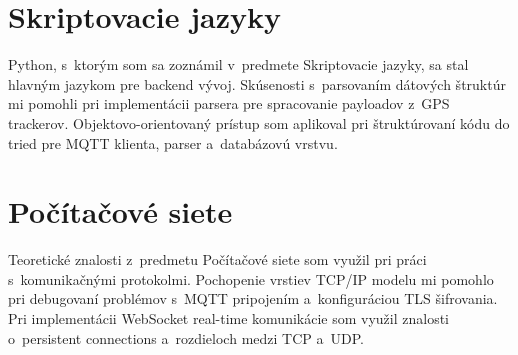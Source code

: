 \section{Skriptovacie jazyky}
\label{sec:ZnalostPython}

Python, s~ktorým som sa zoznámil v~predmete Skriptovacie jazyky, sa stal hlavným jazykom pre backend vývoj. Skúsenosti s~parsovaním dátových štruktúr mi pomohli pri implementácii parsera pre spracovanie payloadov z~GPS trackerov. Objektovo-orientovaný prístup som aplikoval pri štruktúrovaní kódu do tried pre MQTT klienta, parser a~databázovú vrstvu.

\section{Počítačové siete}
\label{sec:ZnalostSite}

Teoretické znalosti z~predmetu Počítačové siete som využil pri práci s~komunikačnými protokolmi. Pochopenie vrstiev TCP/IP modelu mi pomohlo pri debugovaní problémov s~MQTT pripojením a~konfiguráciou TLS šifrovania. Pri implementácii WebSocket real-time komunikácie som využil znalosti o~persistent connections a~rozdieloch medzi TCP a~UDP.

\endinput
